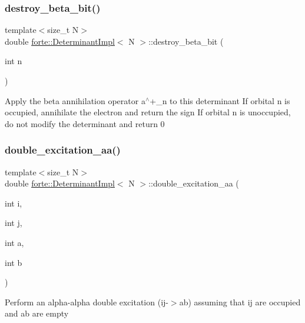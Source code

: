 \subsubsection{\texorpdfstring{destroy\+\_\+beta\+\_\+bit()}{destroy\_beta\_bit()}}
{\footnotesize\ttfamily template$<$size\+\_\+t N$>$ \\
double \mbox{\hyperlink{classforte_1_1_determinant_impl}{forte\+::\+Determinant\+Impl}}$<$ N $>$\+::destroy\+\_\+beta\+\_\+bit (\begin{DoxyParamCaption}\item[{int}]{n }\end{DoxyParamCaption})\hspace{0.3cm}{\ttfamily [inline]}}

Apply the beta annihilation operator a$^\wedge$+\+\_\+n to this determinant If orbital n is occupied, annihilate the electron and return the sign If orbital n is unoccupied, do not modify the determinant and return 0 \mbox{\label{classforte_1_1_determinant_impl_a2279b78fd6dc7dfdcd0e0a1c7f77b9ac}} 
\subsubsection{\texorpdfstring{double\+\_\+excitation\+\_\+aa()}{double\_excitation\_aa()}}
{\footnotesize\ttfamily template$<$size\+\_\+t N$>$ \\
double \mbox{\hyperlink{classforte_1_1_determinant_impl}{forte\+::\+Determinant\+Impl}}$<$ N $>$\+::double\+\_\+excitation\+\_\+aa (\begin{DoxyParamCaption}\item[{int}]{i,  }\item[{int}]{j,  }\item[{int}]{a,  }\item[{int}]{b }\end{DoxyParamCaption})\hspace{0.3cm}{\ttfamily [inline]}}

Perform an alpha-\/alpha double excitation (ij-\/$>$ab) assuming that ij are occupied and ab are empty \mbox{\label{classforte_1_1_determinant_impl_ac5c15433d3496bdd90e867bfe396c948}} 

